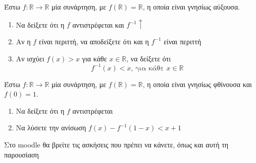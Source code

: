 \documentclass{presentation}
\begin{document}
\begin{askisi}
  Έστω $f:\mathbb{R}\to\mathbb{R}$ μία συνάρτηση, με $f(\mathbb{R})=\mathbb{R}$, η οποία είναι γνησίως αύξουσα.
  \begin{enumerate}
    \item Να δείξετε ότι η $f$ αντιστρέφεται και $f^{-1}\uparrow$\pause
    \item Αν η $f$ είναι περιττή, να αποδείξετε ότι και η $f^{-1}$ είναι περιττή \pause
    \item Αν ισχύει $f(x)>x$ για κάθε $x\in\mathbb{R}$, να δείξετε ότι
          $$f^{-1}(x)<x\text{, για κάθε }x\in\mathbb{R}$$
  \end{enumerate}
\end{askisi}

\begin{askisi}
  Έστω $f:\mathbb{R}\to\mathbb{R}$ μία συνάρτηση, με $f(\mathbb{R})=\mathbb{R}$, η οποία είναι γνησίως φθίνουσα και $f(0)=1$.
  \begin{enumerate}
    \item Να δείξετε ότι η $f$ αντιστρέφεται \pause
    \item Να λύσετε την ανίσωση $f(x)-f^{-1}(1-x)<x+1$
  \end{enumerate}
\end{askisi}

\begin{frame}
  Στο moodle θα βρείτε τις ασκήσεις που πρέπει να κάνετε, όπως και αυτή τη παρουσίαση
\end{frame}
\end{document}
